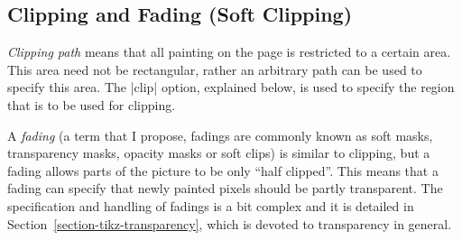 \subsection{Clipping and Fading (Soft Clipping)}

\emph{Clipping path} means that all painting on the page is restricted to a
certain area. This area need not be rectangular, rather an arbitrary path can
be used to specify this area. The |clip| option, explained below, is used to
specify the region that is to be used for clipping.

A \emph{fading} (a term that I propose, fadings are commonly known as soft
masks, transparency masks, opacity masks or soft clips) is similar to clipping,
but a fading allows parts of the picture to be only ``half clipped''. This
means that a fading can specify that newly painted pixels should be partly
transparent. The specification and handling of fadings is a bit complex and it
is detailed in Section~\ref{section-tikz-transparency}, which is devoted to
transparency in general.

